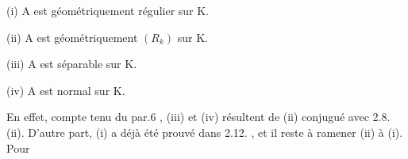 (i) A est géométriquement régulier sur K.

(ii) A est géométriquement $(R_k)$ sur K.

(iii) A est séparable sur K.

(iv) A est  normal sur K.

 En effet, compte tenu du par.6 , (iii) et (iv)
résultent de (ii) conjugué avec 2.8. (ii). D'autre part, (i)
a déjà été prouvé dans 2.12. , et il reste à ramener (ii) à (i). Pour

